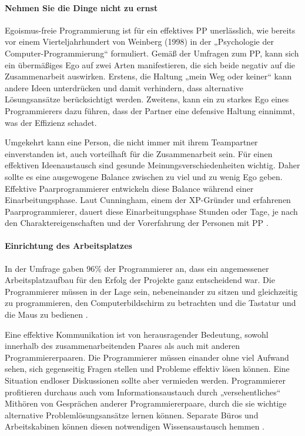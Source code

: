 \paragraph{ Nehmen Sie die Dinge nicht zu ernst} Egoismus-freie Programmierung ist für ein effektives PP unerlässlich, wie bereits vor einem Vierteljahrhundert von Weinberg (1998) in der „Psychologie der Computer-Programmierung“ formuliert. Gemäß der Umfragen zum PP, kann sich ein übermäßiges Ego auf zwei Arten manifestieren, die sich beide negativ auf die Zusammenarbeit auswirken. Erstens, die Haltung „mein Weg oder keiner“ kann andere Ideen unterdrücken und damit verhindern, dass alternative Lösungsansätze berücksichtigt werden. Zweitens, kann ein zu starkes Ego eines Programmierers dazu führen, dass der Partner eine defensive Haltung einnimmt, was der Effizienz schadet.

Umgekehrt kann eine Person, die nicht immer mit ihrem Teampartner einverstanden ist, auch vorteilhaft für die Zusammenarbeit sein. Für einen effektiven Ideenaustausch sind gesunde Meinungsverschiedenheiten wichtig. Daher sollte es eine ausgewogene Balance zwischen zu viel und zu wenig Ego geben. Effektive Paarprogrammierer entwickeln diese Balance während einer Einarbeitungsphase. Laut Cunningham, einem der XP-Gründer und erfahrenen Paarprogrammierer, dauert diese Einarbeitungsphase Stunden oder Tage, je nach den Charaktereigenschaften und der Vorerfahrung der Personen mit PP \cite{Williams2000AllKindergarten}.


\paragraph {Einrichtung des Arbeitsplatzes} In der Umfrage gaben 96\% der Programmierer an, dass ein angemessener Arbeitsplatzaufbau für den Erfolg der Projekte ganz entscheidend war. Die Programmierer müssen in der Lage sein, nebeneinander zu sitzen und gleichzeitig zu programmieren, den Computerbildschirm zu betrachten und die Tastatur und die Maus zu bedienen \cite{Williams2000AllKindergarten}.

Eine effektive Kommunikation ist von herausragender Bedeutung, sowohl innerhalb des zusammenarbeitenden Paares als auch mit anderen Programmiererpaaren. Die Programmierer müssen einander ohne viel Aufwand sehen, sich gegenseitig Fragen stellen und Probleme effektiv lösen können. Eine Situation endloser Diskussionen sollte aber vermieden werden. Programmierer profitieren durchaus auch vom Informationsaustauch durch „versehentliches“ Mithören von Gesprächen anderer Programmiererpaare, durch die sie wichtige alternative Problemlösungsansätze lernen können. Separate Büros und Arbeitskabinen können diesen notwendigen Wissensaustausch hemmen \cite{Williams2000AllKindergarten}.

